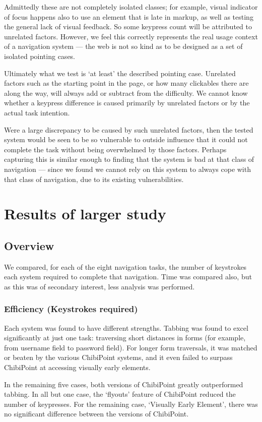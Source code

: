 \documentclass[a4paper, 12pt]{report}
\begin{document}
Admittedly these are not completely isolated classes; for example, visual indicator of focus happens also to use an element that is late in markup, as well as testing the general lack of visual feedback. So some keypress count will be attributed to unrelated factors. However, we feel this correctly represents the real usage context of a navigation system --- the web is not so kind as to be designed as a set of isolated pointing cases.

Ultimately what we test is `at least' the described pointing case. Unrelated factors such as the starting point in the page, or how many clickables there are along the way, will always add or subtract from the difficulty. We cannot know whether a keypress difference is caused primarily by unrelated factors or by the actual task intention.

Were a large discrepancy to be caused by such unrelated factors, then the tested system would be seen to be so vulnerable to outside influence that it could not complete the task without being overwhelmed by those factors. Perhaps capturing this is similar enough to finding that the system is bad at that class of navigation --- since we found we cannot rely on this system to always cope with that class of navigation, due to its existing vulnerabilities.

\chapter{Results of larger study}
\section{Overview}
We compared, for each of the eight navigation tasks, the number of keystrokes each system required to complete that navigation. Time was compared also, but as this was of secondary interest, less analysis was performed.
\subsection{Efficiency (Keystrokes required)}
Each system was found to have different strengths. Tabbing was found to excel significantly at just one task: traversing short distances in forms (for example, from username field to password field). For longer form traversals, it was matched or beaten by the various ChibiPoint systems, and it even failed to surpass ChibiPoint at accessing visually early elements.

In the remaining five cases, both versions of ChibiPoint greatly outperformed tabbing. In all but one case, the `flyouts' feature of ChibiPoint reduced the number of keypresses. For the remaining case, `Visually Early Element', there was no significant difference between the versions of ChibiPoint.
\end{document}
